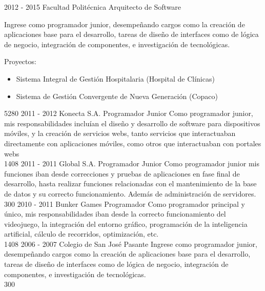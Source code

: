\documentclass[]{friggeri-cv}
\begin{document}
\begin{entrylist}
{	}
    {}


\entry
    {2012 - 2015}
    {Facultad Politécnica}
    {Arquitecto de Software}
    {Ingrese como programador junior, desempeñando cargos como la creación de
        aplicaciones base para el desarrollo, tareas de diseño de interfaces
        como de lógica de negocio, integración de componentes, e investigación
        de tecnológicas.

        Proyectos:
        \begin{itemize}
            \item Sistema Integral de Gestión Hospitalaria (Hospital de
                Clínicas)
            \item Sistema de Gestión Convergente de Nueva Generación (Copaco)
        \end{itemize}}
    {5280}
\entry
    {2011 - 2012}
    {Konecta S.A.}
    {Programador Junior}
    {Como programador junior, mis responsabilidades incluían el diseño y
        desarrollo de software para dispositivos móviles, y la creación de
        servicios webs, tanto servicios que interactuaban directamente con
        aplicaciones móviles, como otros que interactuaban con portales webs
        \\}
    {1408}
\entry
    {2011 - 2011}
    {Global S.A.}
    {Programador Junior}
    {Como programador junior mis funciones iban desde correcciones y pruebas de
        aplicaciones en fase final de desarrollo, hasta realizar funciones
        relacionadas con el mantenimiento de la base de datos y su correcto
        funcionamiento. Además de administración de servidores. \\}
    {300}
\entry
    {2010 - 2011}
    {Bunker Games}
    {Programador}
    {Como programador principal y único, mis responsabilidades iban desde la
        correcto funcionamiento del videojuego, la integración del entorno
        gráfico, programación de la inteligencia artificial, cálculo de
        recorridos, optimización, etc. \\}
    {1408}
\entry
    {2006 - 2007}
    {Colegio de San José}
    {Pasante}
    {Ingrese como programador junior, desempeñando cargos como la
creación de aplicaciones base para el desarrollo, tareas de diseño de
interfaces como de lógica de negocio, integración de componentes, e
investigación de tecnológicas. \\}
    {300}

\end{entrylist}

\newpage
\end{document}
